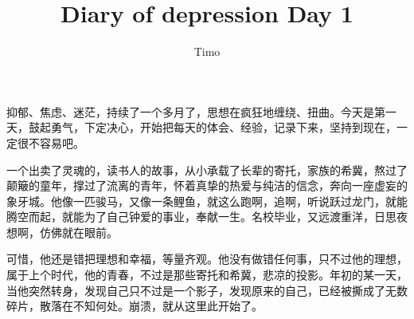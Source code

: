 \documentclass[11pt]{ctexart}
\title{Diary of depression Day 1}
\author{Timo}
\begin{document}
\maketitle

抑郁、焦虑、迷茫，持续了一个多月了，思想在疯狂地缠绕、扭曲。今天是第一天，鼓起勇气，下定决心，开始把每天的体会、经验，记录下来，坚持到现在，一定很不容易吧。\par
一个出卖了灵魂的，读书人的故事，从小承载了长辈的寄托，家族的希冀，熬过了颠簸的童年，撑过了流离的青年，怀着真挚的热爱与纯洁的信念，奔向一座虚妄的象牙城。他像一匹骏马，又像一条鲤鱼，就这么跑啊，追啊，听说跃过龙门，就能腾空而起，就能为了自己钟爱的事业，奉献一生。名校毕业，又远渡重洋，日思夜想啊，仿佛就在眼前。\par
可惜，他还是错把理想和幸福，等量齐观。他没有做错任何事，只不过他的理想，属于上个时代，他的青春，不过是那些寄托和希冀，悲凉的投影。年初的某一天，当他突然转身，发现自己只不过是一个影子，发现原来的自己，已经被撕成了无数碎片，散落在不知何处。崩溃，就从这里此开始了。
\end{document}
